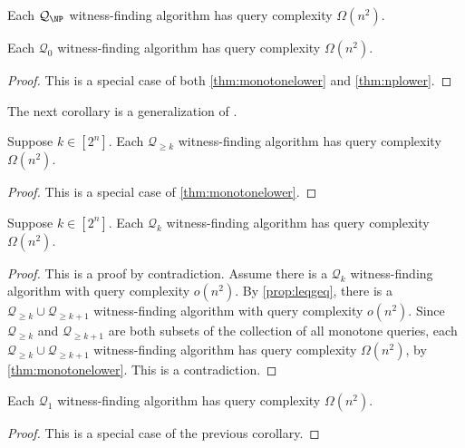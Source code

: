\documentclass{article}
\newcommand{\mc}{\mathcal}
\begin{document}
\begin{theorem}\label{thm:nplower}
  Each $\mc{Q}_{\NP}$ witness-finding algorithm has query complexity $\Omega(n^2)$.
\end{theorem}

\begin{corollary}\label{cor:q0lower}
  Each $\mc{Q}_0$ witness-finding algorithm has query complexity $\Omega(n^2)$.
\end{corollary}
\begin{proof}
  This is a special case of both \autoref{thm:monotonelower} and \autoref{thm:nplower}.
\end{proof}

The next corollary is a generalization of \autocite[Remark~2]{krw12}.

\begin{corollary}
  Suppose $k \in \left[2^n\right]$.
  Each $\mc{Q}_{\geq k}$ witness-finding algorithm has query complexity $\Omega(n^2)$.
\end{corollary}
\begin{proof}
  This is a special case of \autoref{thm:monotonelower}.
\end{proof}

\begin{corollary}
  Suppose $k \in \left[2^n\right]$.
  Each $\mc{Q}_k$ witness-finding algorithm has query complexity $\Omega(n^2)$.
\end{corollary}
\begin{proof}
  This is a proof by contradiction.
  Assume there is a $\mc{Q}_k$ witness-finding algorithm with query complexity $o(n^2)$.
  By \autoref{prop:leqgeq}, there is a $\mc{Q}_{\geq k} \cup \mc{Q}_{\geq k + 1}$ witness-finding algorithm with query complexity $o(n^2)$.
  Since $\mc{Q}_{\geq k}$ and $\mc{Q}_{\geq k + 1}$ are both subsets of the collection of all monotone queries, each $\mc{Q}_{\geq k} \cup \mc{Q}_{\geq k + 1}$ witness-finding algorithm has query complexity $\Omega(n^2)$, by \autoref{thm:monotonelower}.
  This is a contradiction.
\end{proof}

\begin{corollary}\label{cor:q1lower}
  Each $\mc{Q}_1$ witness-finding algorithm has query complexity $\Omega(n^2)$.
\end{corollary}
\begin{proof}
  This is a special case of the previous corollary.
\end{proof}
\end{document}
